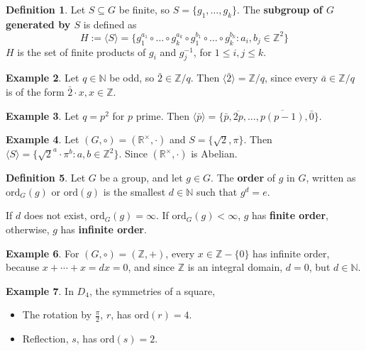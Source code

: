 \documentclass[12pt,a4paper]{article}
\theoremstyle{definition}
\newtheorem{definition}{Definition}[subsection]
\newtheorem{example}[definition]{Example}
\begin{document}
\begin{definition}
	Let $S \subseteq G$ be finite, so $S = \{ g_1, \dots, g_k \}$. The \textbf{subgroup of $G$ generated by $S$} is defined as
	\[
		H := \langle S \rangle = \{ g_1^{a_1} \circ \dots \circ g_k^{a_k} \circ g_1^{b_1} \circ \dots \circ g_k^{b_k}: a_i, b_j \in \mathbb{Z}^2 \}
	\]
	$H$ is the set of finite products of $g_i$ and $g_j^{-1}$, for $1 \le i, j \le k$.
\end{definition}

\begin{example}
	Let $q \in \mathbb{N}$ be odd, so $\bar{2} \in \mathbb{Z} / q$. Then $\langle \bar{2} \rangle = \mathbb{Z} / q$, since every $\bar{a} \in \mathbb{Z} / q$ is of the form $\bar{2} \cdot x, x \in \mathbb{Z}$.
\end{example}

\begin{example}
	Let $q = p^2$ for $p$ prime. Then $\langle \bar{p} \rangle = \{ \bar{p}, \overline{2p}, \dots, \overline{p(p - 1)}, \bar{0} \}$.
\end{example}

\begin{example}
	Let $(G, \circ) = (\mathbb{R}^{\times}, \cdot)$ and $S = \{ \sqrt{2}, \pi \}$. Then $\langle S \rangle = \{ \sqrt{2}^a \cdot \pi^b: a, b \in \mathbb{Z}^2 \}$. Since $(\mathbb{R}^{\times}, \cdot)$ is Abelian.
\end{example}

\begin{definition}
	Let $G$ be a group, and let $g \in G$. The \textbf{order} of $g$ in $G$, written as $\text{ord}_G (g)$ or $\text{ord}(g)$ is the smallest $d \in \mathbb{N}$ such that $g^d = e$.

	If $d$ does not exist, $\text{ord}_G(g) = \infty$. If $\text{ord}_G(g) < \infty$, $g$ has \textbf{finite order}, otherwise, $g$ has \textbf{infinite order}.
\end{definition}

\begin{example}
	For $(G, \circ) = (\mathbb{Z}, +)$, every $x \in \mathbb{Z} - \{ 0 \}$ has infinite order, because $x + \cdots + x = dx = 0$, and since $\mathbb{Z}$ is an integral domain, $d = 0$, but $d \in \mathbb{N}$.
\end{example}

\begin{example}
	In $D_4$, the symmetries of a square,
	\begin{itemize}
		\item The rotation by $\frac{\pi}{2}$, $r$, has $\text{ord} (r) = 4$.
		\item Reflection, $s$, has $\text{ord}(s) = 2$.
	\end{itemize}
\end{example}
\end{document}

